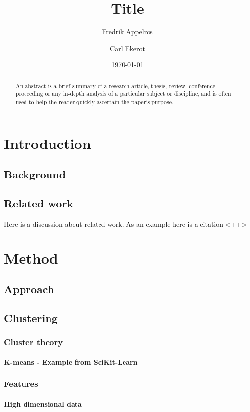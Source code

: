 \documentclass[a4paper]{report}
\begin{document}
\title{Title}
\author{Fredrik Appelros \and Carl Ekerot}
\date{\today}
\maketitle

\begin{abstract}
An abstract is a brief summary of a research article, thesis, review, conference proceeding or any in-depth analysis of a particular subject or discipline, and is often used to help the reader quickly ascertain the paper's purpose.
\end{abstract}

\tableofcontents

\chapter{Introduction}
\section{Background}
\section{Related work}
Here is a discussion about related work. As an example here is a citation \cite{cui2007discoverer}<++>
\chapter{Method}
\section{Approach}
\section{Clustering}
\subsection{Cluster theory}
\subsubsection{K-means - Example from SciKit-Learn}
\subsection{Features}
\subsubsection{High dimensional data}
\end{document}
